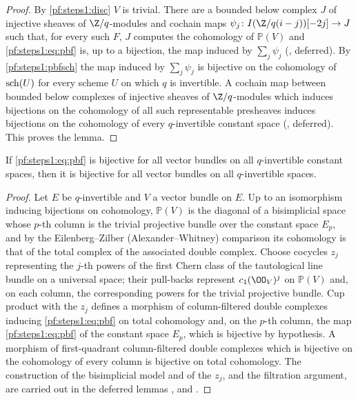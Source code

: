 \begin{proof}
By \cref{pf:steps1:disc} $V$ is trivial. There are a bounded below complex $J$ of injective sheaves of
$\Z/q$-modules and cochain maps $\psi_j\colon I(\Z/q(i-j))[-2j]\to J$ such that, for every such $F$, $J$
computes the cohomology of $\mathbb P(V)$ and \eqref{pf:steps1:eq:pbf} is, up to a bijection, the map induced by
$\sum_j\psi_j$ (, deferred). By
\cref{pf:steps1:pbfsch} the map induced by $\sum_j\psi_j$ is bijective on the cohomology of $\mathrm{sch}(U)$ for
every scheme $U$ on which $q$ is invertible. A cochain map between bounded below complexes of injective
sheaves of $\Z/q$-modules which induces bijections on the cohomology of all such representable presheaves
induces bijections on the cohomology of every $q$-invertible constant space
(, deferred). This proves the lemma.
\end{proof}

\begin{lemma}\label{pf:steps1:pbfred}
If \eqref{pf:steps1:eq:pbf} is bijective for all vector bundles on all $q$-invertible constant spaces, then it is
bijective for all vector bundles on all $q$-invertible spaces.
\end{lemma}

\begin{proof}
Let $E$ be $q$-invertible and $V$ a vector bundle on $E$. Up to an isomorphism inducing bijections on
cohomology, $\mathbb P(V)$ is the diagonal of a bisimplicial space whose $p$-th column is the trivial projective
bundle over the constant space $E_p$, and by the Eilenberg--Zilber (Alexander--Whitney) comparison its
cohomology is that of the total complex of the associated double complex. Choose cocycles $z_j$ representing the
$j$-th powers of the first Chern class of the tautological line bundle on a universal space; their pull-backs
represent $c_1(\OO_V)^j$ on $\mathbb P(V)$ and, on each column, the corresponding powers for the trivial projective
bundle. Cup product with the $z_j$ defines a morphism of column-filtered double complexes inducing
\eqref{pf:steps1:eq:pbf} on total cohomology and, on the $p$-th column, the map \eqref{pf:steps1:eq:pbf} of the
constant space $E_p$, which is bijective by hypothesis. A morphism of first-quadrant column-filtered double
complexes which is bijective on the cohomology of every column is bijective on total cohomology. The
construction of the bisimplicial model and of the $z_j$, and the filtration argument, are carried out in the
deferred lemmas ,
 and
.
\end{proof}

